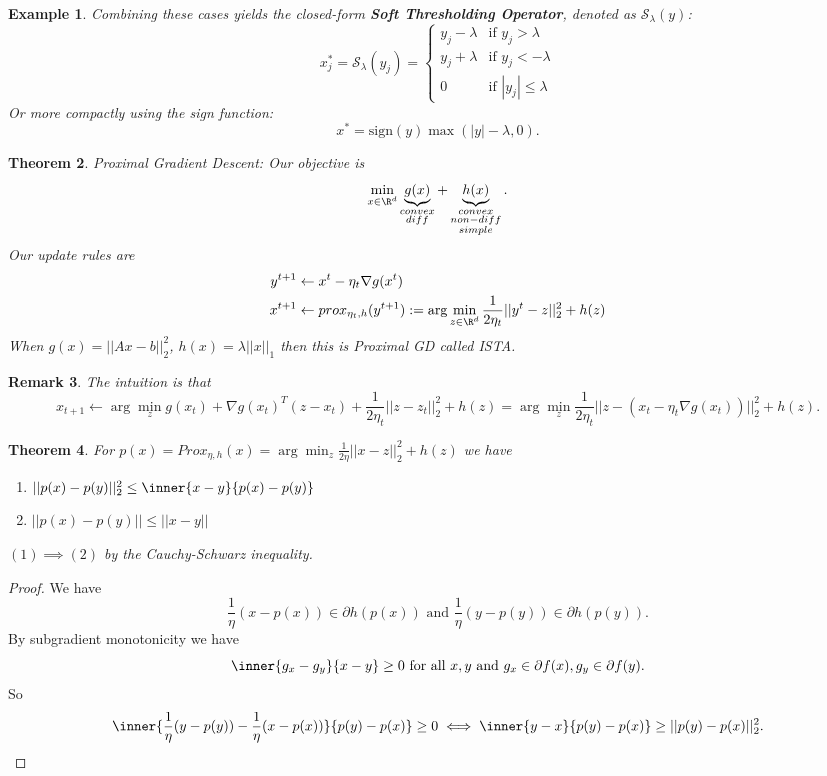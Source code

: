 \documentclass[a4paper]{article}
\newtheorem{thm}{Theorem}[section]
\newtheorem{eg}[thm]{Example}
\newtheorem{rmk}[thm]{Remark}
\begin{document}
\begin{eg}
    Combining these cases yields the closed-form \textbf{Soft Thresholding Operator}, denoted as $\mathcal{S}_\lambda(y)$:
    \[
        x_j^* = \mathcal{S}_\lambda(y_j) = 
        \begin{cases} 
            y_j - \lambda & \text{if } y_j > \lambda \\
            y_j + \lambda & \text{if } y_j < -\lambda \\
            0 & \text{if } |y_j| \le \lambda
        \end{cases}
    \]
    Or more compactly using the sign function:
    \[
        x^* = \text{sign}(y) \max(|y| - \lambda, 0).
    \]
\end{eg}
\begin{thm}
    Proximal Gradient Descent: Our objective is \[
    \min_{x\in \R^d}\underbrace{g(x)}_{\substack{convex \\ diff}} +\underbrace{h(x)}_{\substack{convex \\ non-diff\\ simple}}
    .\] 
    Our update rules are 
    \begin{align*}
        y^{t+1}&\leftarrow x^t-\eta_t \nabla g(x^t)\\
        x^{t+1}&\leftarrow prox_{\eta_t,h}(y^{t+1}):=\arg\min_{z\in \R^d} \frac{1}{2\eta_t}||y^t-z||_2^2+h(z)
    \end{align*}
    When $g(x)=||Ax-b||_2^2$, $h(x)=\lambda||x||_1$ then this is Proximal GD called ISTA. 
\end{thm}
\begin{rmk}
    The intuition is that \[
    x_{t+1}\leftarrow \arg\min_z g(x_t)+\nabla g(x_t)^T(z-x_t)+\frac{1}{2\eta_t}||z-z_t||_2^2+h(z)=\arg\min_{z}\frac{1}{2\eta_t}||z-(x_t-\eta_t\nabla g(x_t))||_2^2+h(z)
    .\] 
\end{rmk}
\begin{thm}
    For $p(x)=Prox_{\eta, h}(x)=\arg\min_{z}\frac{1}{2\eta}||x-z||_2^2+h(z)$ we have 
    \begin{enumerate}
        \item $||p(x)-p(y)||_2^2\leq \inner{x-y}{p(x)-p(y)}$
        \item $||p(x)-p(y)||\leq ||x-y||$
    \end{enumerate}
    $(1)\implies (2)$ by the Cauchy-Schwarz inequality.
\end{thm}
\begin{proof}
    We have \[
    \frac{1}{\eta}(x-p(x))\in \partial h(p(x)) \text{ and } \frac{1}{\eta}(y-p(y))\in \partial h(p(y)) 
    .\] 
    By subgradient monotonicity we have \[
    \inner{g_x-g_y}{x-y}\geq 0 \text{ for all } x,y \text{ and } g_x\in\partial f(x),g_y\in \partial f(y)
    .\] 
    So \[
    \inner{ \frac{1}{\eta}(y-p(y))-\frac{1}{\eta}(x-p(x))}{p(y)-p(x)}\geq 0 \iff \inner{y-x}{p(y)-p(x)}\geq ||p(y)-p(x)||_2^2 
    .\] 
\end{proof}
\end{document}
